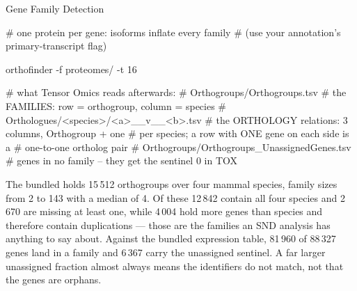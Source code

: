 \begin{recipe}[label=sub:gene-family-detection]{Gene Family Detection}

\begin{codefragment}[language=bash,caption={The external step, and what to keep from it}]
# one protein per gene: isoforms inflate every family
# (use your annotation's primary-transcript flag)

orthofinder -f proteomes/ -t 16

# what Tensor Omics reads afterwards:
#   Orthogroups/Orthogroups.tsv
#       the FAMILIES: row = orthogroup, column = species
#   Orthologues/<species>/<a>__v__<b>.tsv
#       the ORTHOLOGY relations: 3 columns, Orthogroup + one
#       per species; a row with ONE gene on each side is a
#       one-to-one ortholog pair
#   Orthogroups/Orthogroups_UnassignedGenes.tsv
#       genes in no family -- they get the sentinel 0 in TOX
\end{codefragment}

\begin{parameters}
\end{parameters}

\begin{expectedresults}
  The bundled  holds 15\,512 orthogroups over
  four mammal species, family sizes from 2 to 143 with a median of 4. Of these
  12\,842 contain all four species and 2\,670 are missing at least one, while
  4\,004 hold more genes than species and therefore contain duplications ---
  those are the families an SND analysis has anything to say about. Against the
  bundled expression table, 81\,960 of 88\,327 genes land in a family and
  6\,367 carry the unassigned sentinel. A far larger unassigned fraction almost
  always means the identifiers do not match, not that the genes are orphans.
\end{expectedresults}


\end{recipe}
